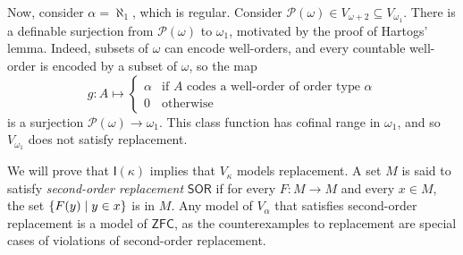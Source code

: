 Now, consider \( \alpha = \aleph_1 \), which is regular.
Consider \( \mathcal P(\omega) \in V_{\omega + 2} \subseteq V_{\omega_1} \).
There is a definable surjection from \( \mathcal P(\omega) \) to \( \omega_1 \), motivated by the proof of Hartogs' lemma.
Indeed, subsets of \( \omega \) can encode well-orders, and every countable well-order is encoded by a subset of \( \omega \), so the map
\[ g : A \mapsto \begin{cases}
    \alpha & \text{if } A \text{ codes a well-order of order type } \alpha \\
    0 & \text{otherwise}
\end{cases} \]
is a surjection \( \mathcal P(\omega) \to \omega_1 \).
This class function has cofinal range in \( \omega_1 \), and so \( V_{\omega_1} \) does not satisfy replacement.

We will prove that \( \mathsf{I}(\kappa) \) implies that \( V_\kappa \) models replacement.
A set \( M \) is said to satisfy \emph{second-order replacement} \( \mathsf{SOR} \) if for every \( F : M \to M \) and every \( x \in M \), the set \( \qty{F(y) \mid y \in x} \) is in \( M \).
Any model of \( V_\alpha \) that satisfies second-order replacement is a model of \( \mathsf{ZFC} \), as the counterexamples to replacement are special cases of violations of second-order replacement.

